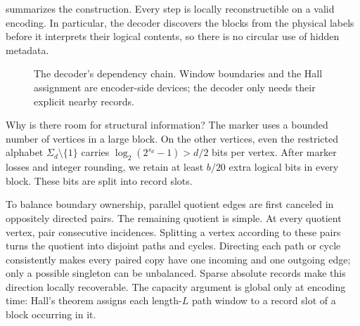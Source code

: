 \documentclass[11pt]{article}
\theoremstyle{definition}
\theoremstyle{remark}
\begin{document}
 summarizes the construction.  Every step is locally
reconstructible on a valid encoding.  In particular, the decoder discovers
the blocks from the physical labels before it interprets their logical
contents, so there is no circular use of hidden metadata.

\begin{figure}[H]
\centering
{}
\caption{The decoder's dependency chain.  Window boundaries and the Hall
assignment are encoder-side devices; the decoder only needs their explicit
nearby records.}
\label{fig:pipeline}
\end{figure}

Why is there room for structural information?  The marker uses a bounded
number of vertices in a large block.  On the other vertices, even the
restricted alphabet $\Sigma_d\setminus\{1\}$ carries
$\log_2(2^{s_d}-1)>d/2$ bits per vertex.  After marker losses and integer
rounding, we retain at least $b/20$ extra logical bits in every block.  These
bits are split into record slots.

To balance boundary ownership, parallel quotient edges are first canceled
in oppositely directed pairs.  The remaining quotient is simple.  At every
quotient vertex, pair consecutive incidences.  Splitting a vertex according
to these pairs turns the quotient into disjoint paths and cycles.  Directing
each path or cycle consistently makes every paired copy have one incoming
and one outgoing edge; only a possible singleton can be unbalanced.  Sparse
absolute records make this direction locally recoverable.  The capacity
argument is global only at encoding time: Hall's theorem assigns each
length-$L$ path window to a record slot of a block occurring in it.
\end{document}
